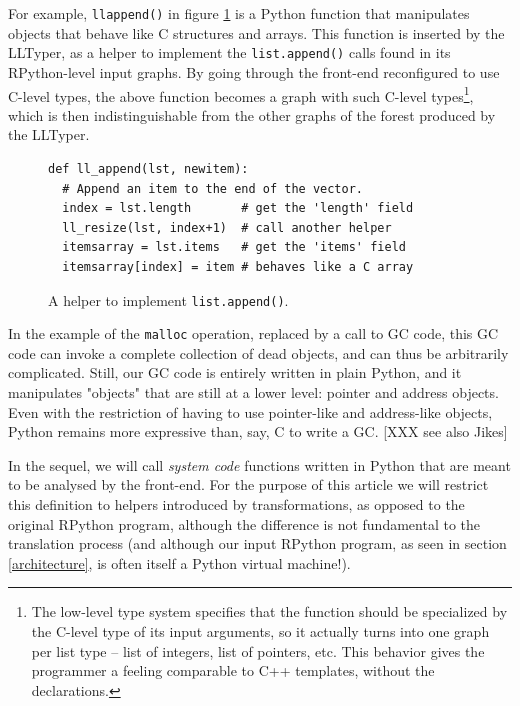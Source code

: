 \documentclass{acm_proc_article-sp}
\begin{document}
For example, \texttt{ll\textunderscore{}append()} in figure \ref{fig_llappend}
is a Python function
that manipulates objects that behave like C structures and arrays.
This function is inserted by the LLTyper, as a helper to implement the
\texttt{list.append()} calls found in its RPython-level input graphs.
By going through the front-end reconfigured to use C-level types, the
above function becomes a graph with such C-level types\footnote{The
low-level type system specifies that the function should be
specialized by the C-level type of its input arguments, so it actually
turns into one graph per list type -- list of integers, list of
pointers, etc.  This behavior gives the programmer a feeling
comparable to C++ templates, without the declarations.}, which is then
indistinguishable from the other graphs of the forest produced by the
LLTyper.

\begin{figure}
\begin{verbatim}
def ll_append(lst, newitem):
  # Append an item to the end of the vector.
  index = lst.length       # get the 'length' field
  ll_resize(lst, index+1)  # call another helper
  itemsarray = lst.items   # get the 'items' field
  itemsarray[index] = item # behaves like a C array
\end{verbatim}
\caption{A helper to implement \texttt{list.append()}.}
\label{fig_llappend}
\end{figure}

In the example of the \texttt{malloc} operation, replaced by a call to GC
code, this GC code can invoke a complete collection of dead objects, and
can thus be arbitrarily complicated.  Still, our GC code is entirely
written in plain Python, and it manipulates "objects" that are still at
a lower level: pointer and address objects.  Even with the restriction
of having to use pointer-like and address-like objects, Python remains
more expressive than, say, C to write a GC.  [XXX see also Jikes]

In the sequel, we will call \textit{system code} functions written in
Python that are meant to be analysed by the front-end.  For the
purpose of this article we will restrict this definition to helpers
introduced by transformations, as opposed to the original RPython
program, although the difference is not fundamental to the translation
process (and although our input RPython program, as seen in section
\ref{architecture}, is often itself a Python virtual machine!).
\end{document}

